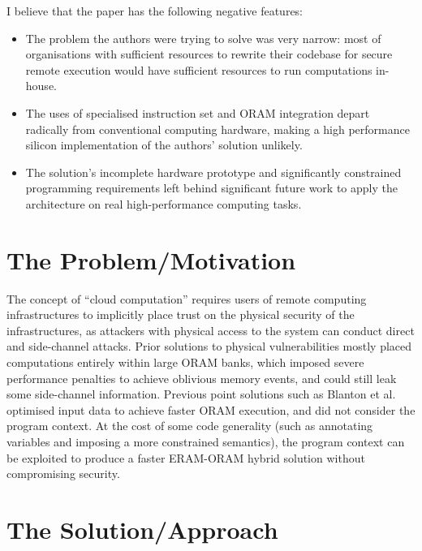 \documentclass[11pt]{article}
\begin{document}
I believe that the paper has the following negative features:
\begin{itemize}
	\item The problem the authors were trying to solve was very narrow: most of organisations with sufficient resources to rewrite their codebase for secure remote execution would have sufficient resources to run computations in-house. 
	\item The uses of specialised instruction set and ORAM integration depart radically from conventional computing hardware, making a high performance silicon implementation of the authors' solution unlikely.
	\item The solution's incomplete hardware prototype and significantly constrained programming requirements left behind significant future work to apply the architecture on real high-performance computing tasks.
\end{itemize}

\section*{The Problem/Motivation}

The concept of ``cloud computation'' requires users of remote computing infrastructures to implicitly place trust on the physical security of the infrastructures, as attackers with physical access to the system can conduct direct and side-channel attacks. Prior solutions to physical vulnerabilities mostly placed computations entirely within large ORAM banks, which imposed severe performance penalties to achieve oblivious memory events, and could still leak some side-channel information. Previous point solutions such as Blanton et al. \cite{blanton2013data} optimised input data to achieve faster ORAM execution, and did not consider the program context. At the cost of some code generality (such as annotating variables and imposing a more constrained semantics), the program context can be exploited to produce a faster ERAM-ORAM hybrid solution without compromising security.

\section*{The Solution/Approach}
\end{document}
